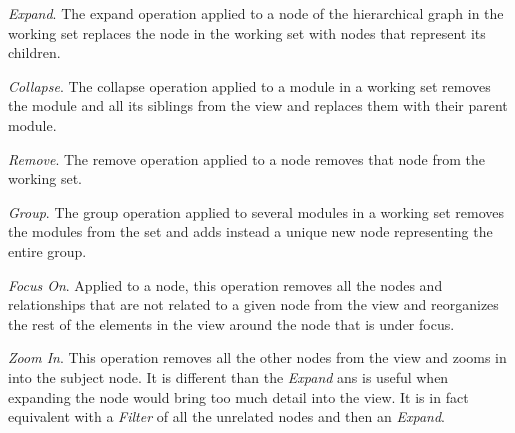 \documentclass[preprint,12pt]{elsarticle}
\begin{document}
\begin{description}

\item {\em Expand}. The expand operation applied to a node of the hierarchical graph in the working set replaces the node in the working set with nodes that represent its children. 

%
%
%
\item {\em Collapse}. The collapse operation applied to a module in a working set removes the module and all its siblings from the view and replaces them with their parent module. 

%
%
%
\item {\em Remove}. The remove operation applied to a node removes that node from the working set. 

%
%

\item {\em Group}. The group operation applied to several modules in a working set removes the modules from the set and adds instead a unique new node representing the entire group. 

\item {\em Focus On}. Applied to a node, this operation removes all the nodes and relationships that are not related to a given node from the view and reorganizes the rest of the elements in the view around the node that is under focus.

\item {\em Zoom In}. This operation removes all the other nodes from the view and zooms in into the subject node. It is different than the {\em Expand} ans is useful when expanding the node would bring too much detail into the view. It is in fact equivalent with a {\em Filter} of all the unrelated nodes and then an {\em Expand}.

%
%
%
\end{description}
\end{document}
